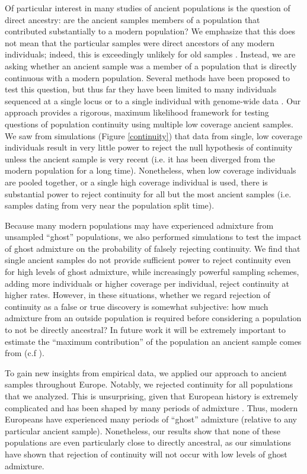 \documentclass[11pt, oneside]{article}   	%
\begin{document}
Of particular interest in many studies of ancient populations is the question of direct ancestry: are the ancient samples members of a population that contributed substantially to a modern population? We emphasize that this does not mean that the particular samples were direct ancestors of any modern individuals; indeed, this is exceedingly unlikely for old samples \citep{rohde2004modelling, chang1999recent, baird2003distribution, donnelly1983probability}. Instead, we are asking whether an ancient sample was a member of a population that is directly continuous with a modern population. Several methods have been proposed to test this question, but thus far they have been limited to many individuals sequenced at a single locus \citep{sjodin2014assessing} or to a single individual with genome-wide data \citep{rasmussen2014genome}. Our approach provides a rigorous, maximum likelihood framework for testing questions of population continuity using multiple low coverage ancient samples. We saw from simulations (Figure \ref{continuity}) that data from single, low coverage individuals result in very little power to reject the null hypothesis of continuity unless the ancient sample is very recent (i.e. it has been diverged from the modern population for a long time). Nonetheless, when low coverage individuals are pooled together, or a single high coverage individual is used, there is substantial power to reject continuity for all but the most ancient samples (i.e. samples dating from very near the population split time).

Because many modern populations may have experienced admixture from unsampled ``ghost'' populations, we also performed simulations to test the impact of ghost admixture on the probability of falsely rejecting continuity. We find that single ancient samples do not provide sufficient power to reject continuity even for high levels of ghost admixture, while increasingly powerful sampling schemes, adding more individuals or higher coverage per individual, reject continuity at higher rates. However, in these situations, whether we regard rejection of continuity as a false or true discovery is somewhat subjective: how much admixture from an outside population is required before considering a population to not be directly ancestral? In future work it will be extremely important to estimate the ``maximum contribution'' of the population an ancient sample comes from (c.f \citet{sjodin2014assessing}). 

To gain new insights from empirical data, we applied our approach to ancient samples throughout Europe. Notably, we rejected continuity for all populations that we analyzed. This is unsurprising, given that European history is extremely complicated and has been shaped by many periods of admixture \citep{lazaridis2014ancient, haak2015massive, lazaridis2016genomic}. Thus, modern Europeans have experienced many periods of ``ghost'' admixture (relative to any particular ancient sample). Nonetheless, our results show that none of these populations are even particularly close to directly ancestral, as our simulations have shown that rejection of continuity will not occur with low levels of ghost admixture.
\end{document}
